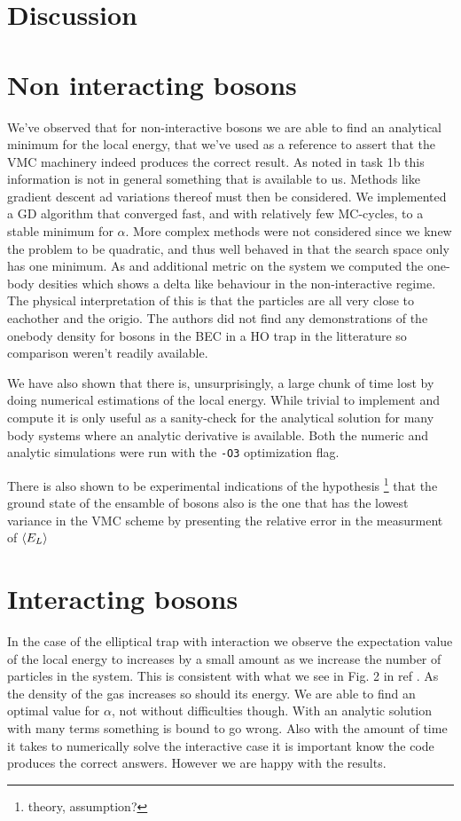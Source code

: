 \section{Discussion}
\section{Non interacting bosons}

We've observed that for non-interactive bosons we are able to find an analytical minimum for the local energy, that we've used as a reference to assert that the VMC machinery indeed produces the correct result. As noted in task 1b this information is not in general something that is available to us. Methods like gradient descent ad variations thereof must then be considered. We implemented a GD algorithm that converged fast, and with relatively few MC-cycles, to a stable minimum for $\alpha$. More complex methods were not considered since we knew the problem to be quadratic, and thus well behaved in that the search space only has one minimum. 
As and additional metric on the system we computed the one-body desities which shows a delta like behaviour in the non-interactive regime. The physical interpretation of this is that the particles are all very close to eachother and the origio. The authors did not find any demonstrations of the onebody density for bosons in the BEC in a HO trap in the litterature so comparison weren't readily available. 

We have also shown that there is, unsurprisingly, a large chunk of time lost by doing numerical estimations of the local energy. While trivial to implement and compute it is only useful as a sanity-check for the analytical solution for many body systems where an analytic derivative is available. Both the numeric and analytic simulations were run with the \lstinline{-O3} optimization flag. 

There is also shown to be experimental indications of the hypothesis \footnote{theory, assumption?} that the ground state of the ensamble of bosons also is  the one that has the lowest variance in the VMC scheme by presenting the relative error in the measurment of $\langle E_L \rangle$  


\section{Interacting bosons}
In the case of the elliptical trap with interaction we observe the expectation value of the local energy to increases by a small amount as we increase the number of particles in the system. This is consistent with what we see in Fig. 2 in ref \cite{VMC}. As the density of the gas increases so should its energy. 
We are able to find an optimal value for $\alpha$, not without difficulties though. With an analytic solution with many terms something is bound to go wrong. Also with the amount of time it takes to numerically solve the interactive case it is important know the code produces the correct answers. However we are happy with the results.

